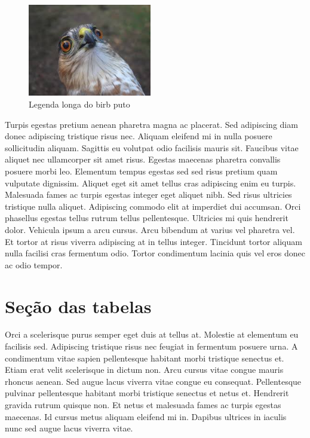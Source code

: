 \documentclass[12pt]{article}
\begin{document}
		\begin{figure}
			\vspace{-10pt}
			\begin{center}
				\includegraphics[width=0.48\textwidth]{figuras/birb_03}
			\end{center}
			\vspace{-20pt} %
			\caption[Legenda curta do birb puto]{Legenda longa do birb puto}
			\vspace{-10pt} %
			\label{fig:birb03}
		\end{figure}
	
		Turpis egestas pretium aenean pharetra magna ac placerat. Sed adipiscing diam donec adipiscing tristique risus nec. Aliquam eleifend mi in nulla posuere sollicitudin aliquam. Sagittis eu volutpat odio facilisis mauris sit. Faucibus vitae aliquet nec ullamcorper sit amet risus. Egestas maecenas pharetra convallis posuere morbi leo. Elementum tempus egestas sed sed risus pretium quam vulputate dignissim. Aliquet eget sit amet tellus cras adipiscing enim eu turpis. Malesuada fames ac turpis egestas integer eget aliquet nibh. Sed risus ultricies tristique nulla aliquet. Adipiscing commodo elit at imperdiet dui accumsan. Orci phasellus egestas tellus rutrum tellus pellentesque. Ultricies mi quis hendrerit dolor. Vehicula ipsum a arcu cursus. Arcu bibendum at varius vel pharetra vel. Et tortor at risus viverra adipiscing at in tellus integer. Tincidunt tortor aliquam nulla facilisi cras fermentum odio. Tortor condimentum lacinia quis vel eros donec ac odio tempor.
		\newpage
		
		\section{Seção das tabelas}
			Orci a scelerisque purus semper eget duis at tellus at. Molestie at elementum eu facilisis sed. Adipiscing tristique risus nec feugiat in fermentum posuere urna. A condimentum vitae sapien pellentesque habitant morbi tristique senectus et. Etiam erat velit scelerisque in dictum non. Arcu cursus vitae congue mauris rhoncus aenean. Sed augue lacus viverra vitae congue eu consequat. Pellentesque pulvinar pellentesque habitant morbi tristique senectus et netus et. Hendrerit gravida rutrum quisque non. Et netus et malesuada fames ac turpis egestas maecenas. Id cursus metus aliquam eleifend mi in. Dapibus ultrices in iaculis nunc sed augue lacus viverra vitae.
			
\end{document}
